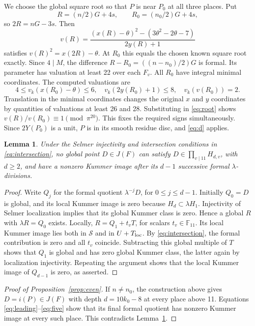 \documentclass[11pt,reqno]{amsart}
\newcommand{\F}{\mathbb F}\newcommand{\OO}{\mathcal O}
\newtheorem{lemma}[theorem]{Lemma}
\theoremstyle{definition}\newtheorem{definition}[theorem]{Definition}
\theoremstyle{remark}\newtheorem{remark}[theorem]{Remark}
\numberwithin{equation}{section}
\begin{document}
We choose the global square root so that \(P\) is near \(P_0\) at
all three places. Put
\[
 R=(n/2)G+4s,\qquad R_0=(n_0/2)G+4s,
\]
so \(2R=nG-3s\). Then
\begin{equation}\label{eq:root}
 v(R)=\frac{(x(R)-\theta)^2-(3\theta^2-2\theta-7)}{2y(R)+1}
\end{equation}
satisfies \(v(R)^2=x(2R)-\theta\). At \(R_0\) this equals the chosen
known square root exactly. Since \(4\mid M\), the difference
\(R-R_0=((n-n_0)/2)G\) is formal. Its parameter has valuation at least
22 over each \(F_v\). All \(R_0\) have integral minimal coordinates.
The computed valuations are
\[
 4\le v_k(x(R_0)-\theta)\le6,\quad
 v_k(2y(R_0)+1)\le8,\quad v_k(v(R_0))=2.
\]
Translation in the minimal coordinates changes the original \(x\)
and \(y\) coordinates by quantities of valuations at least 26 and 28.
Substituting in \eqref{eq:root} shows
\(v(R)/v(R_0)\equiv1\pmod{\pi^{20}}\).
This fixes the required signs simultaneously. Since \(2Y(P_0)\) is
a unit, \(P\) is in its smooth residue disc, and \eqref{eq:d} applies.

\begin{lemma}\label{lem:global}
Under the Selmer injectivity and intersection conditions in
\eqref{eq:intersection}, no global point \(D\in J(F)\) can satisfy
\(D\in\prod_{v\mid11}H_{d,v}\), with \(d\ge2\), and have a nonzero
Kummer image after its \(d-1\) successive formal \(\lambda\)-divisions.
\end{lemma}
\begin{proof}
Write \(Q_j\) for the formal quotient \(\lambda^{-j}D\), for
\(0\le j\le d-1\). Initially \(Q_0=D\) is global, and its local
Kummer image is zero because \(H_d\subset\lambda H_1\).
Injectivity of Selmer localization implies that its global Kummer
class is zero. Hence a global \(R\) with \(\lambda R=Q_0\) exists.
Locally, \(R=Q_1+t_vT\), for scalars \(t_v\in\F_{11}\). Its local
Kummer image lies both in \(\mathcal S\) and in \(U+T_{\rm loc}\).
By \eqref{eq:intersection}, the formal contribution is zero and all
\(t_v\) coincide. Subtracting this global multiple of \(T\) shows
that \(Q_1\) is global and has zero global Kummer class, the latter
again by localization injectivity. Repeating the argument shows that
the local Kummer image of \(Q_{d-1}\) is zero, as asserted.
\end{proof}

\begin{proof}[Proof of Proposition~\ref{prop:even}]
If \(n\ne n_0\), the construction above gives \(D=i(P)\in J(F)\)
with depth \(d=10k_0-8\) at every place above 11.
Equations \eqref{eq:leading}--\eqref{eq:five} show that its final formal
quotient has nonzero Kummer image at every such place. This contradicts
Lemma~\ref{lem:global}.
\end{proof}
\end{document}
